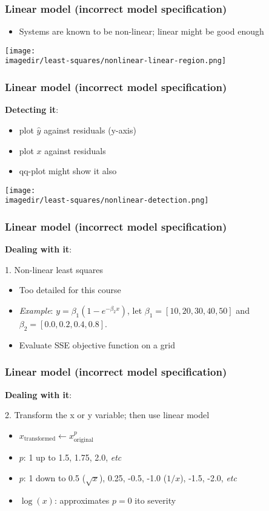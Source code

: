 \begin{frame}\frametitle{Linear model (incorrect model specification)}
	\begin{itemize}
		\item	Systems are known to be non-linear; linear might be good enough 
	\end{itemize}
	\begin{center}
		\texttt{[image: \\imagedir/least-squares/nonlinear-linear-region.png]}
	\end{center}
\end{frame}

\begin{frame}\frametitle{Linear model (incorrect model specification)}
	
	\textbf{Detecting it}: 
	\begin{itemize}
		\item	plot $\hat{y}$ against residuals (y-axis) 
		\item	plot $x$ against residuals 
		\item	qq-plot might show it also 
	\end{itemize}
	\begin{center}
		\texttt{[image: \\imagedir/least-squares/nonlinear-detection.png]}
	\end{center}
\end{frame}

\begin{frame}\frametitle{Linear model (incorrect model specification)}
	
	\textbf{Dealing with it}:
	
	1. Non-linear least squares 
	\begin{itemize}
		\item	Too detailed for this course 
		\item	\emph{Example}: $y = \beta_1\left(1-e^{-\beta_2 x} \right)$, let $\beta_1 = [10, 20, 30, 40, 50]$ and $\beta_2 = [0.0, 0.2, 0.4, 0.8]$. 
		\item	Evaluate SSE objective function on a grid 
	\end{itemize}
\end{frame}

\begin{frame}\frametitle{Linear model (incorrect model specification)}
	
	\textbf{Dealing with it}:
	
	2. Transform the x or y variable; then use linear model 
	\begin{itemize}
		\item	$x_\text{transformed} \leftarrow x^p_\text{original}$ 
		\item	$p$: 1 up to 1.5, 1.75, 2.0, \emph{etc} 
		\item	$p$: 1 down to 0.5 ($\sqrt{x}$), 0.25, -0.5, -1.0 ($1/x$), -1.5, -2.0, \emph{etc} 
		\item	$\log(x)$: approximates $p=0$ ito severity 
	\end{itemize}
\end{frame}

